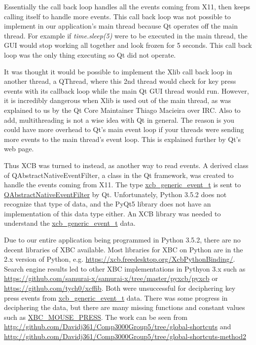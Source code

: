 \documentclass[12pt]{article}
\begin{document}
Essentially the call back loop handles all the events coming from X11, then keeps calling itself to handle more events.
This call back loop was not possible to implement in our application's main thread because Qt operates off the main thread.
For example if \emph{time.sleep(5)} were to be executed in the main thread, the GUI would stop working all together and look frozen for 5 seconds.
This call back loop was the only thing executing so Qt did not operate.

It was thought it would be possible to implement the Xlib call back loop in another thread, a QThread, where this 2nd thread would check for key press events with its callback loop while the main Qt GUI thread would run.
However, it is incredibly dangerous when Xlib is used out of the main thread, as was explained to us by the Qt Core Maintainer Thiago Macieira over IRC.
Also to add, multithreading is not a wise idea with Qt in general.
The reason is you could have more overhead to Qt's main event loop if your threads were sending more events to the main thread's event loop. This is explained further by Qt's web page\cite{QtThreading}.

Thus XCB was turned to instead, as another way to read events.
A derived class of QAbstractNativeEventFilter, a class in the Qt framework, was created to handle the events coming from X11.
The type \url{xcb_generic_event_t} is sent to \url{QAbstractNativeEventFilter} by Qt.
Unfortunately, Python 3.5.2 does not recognize that type of data, and the PyQt5 library does not have an implementation of this data type either.
An XCB library was needed to understand the \url{xcb_generic_event_t} data.

Due to our entire application being programmed in Python 3.5.2, there are no decent libraries of XBC available.
Most libraries for XBC on Python are in the 2.x version of Python, e.g. \url{https://xcb.freedesktop.org/XcbPythonBinding/}.
Search engine results led to other XBC implementations in Pythyon 3.x such as \url{https://github.com/samurai-x/samurai-x/tree/master/pyxcb/pyxcb} or \url{https://github.com/tych0/xcffib}.
Both were unsuccessful for deciphering key press events from \url{xcb_generic_event_t} data.
There was some progress in deciphering the data, but there are many missing functions and constant values such as \url{XBC_MOUSE_PRESS}. The work can be seen from \url{http://github.com/Davidj361/Comp3000Group5/tree/global-shortcuts} and \url{http://github.com/Davidj361/Comp3000Group5/tree/global-shortcuts-method2}
\end{document}
